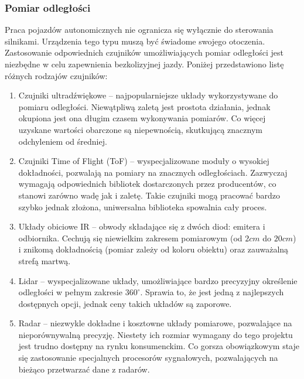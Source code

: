         \subsubsection{Pomiar odległości}
            Praca pojazdów autonomicznych nie ogranicza się wyłącznie do sterowania silnikami.
            Urządzenia tego typu muszą być świadome swojego otoczenia.
            Zastosowanie odpowiednich czujników umożliwiających pomiar odległości jest niezbędne w celu zapewnienia bezkolizyjnej jazdy.
            Poniżej przedstawiono listę różnych rodzajów czujników:
            \begin{enumerate}
                \item Czujniki ultradźwiękowe -- najpopularniejsze układy wykorzystywane do pomiaru odległości.
                Niewątpliwą zaletą jest prostota działania, jednak okupiona jest ona długim czasem wykonywania pomiarów.
                Co więcej uzyskane wartości obarczone są niepewnością, skutkującą znacznym odchyleniem od średniej.
                \item Czujniki Time of Flight (ToF) -- wyspecjalizowane moduły o wysokiej dokładności, pozwalają na pomiary na znacznych odległościach.
                Zazwyczaj wymagają odpowiednich bibliotek dostarczonych przez producentów, co stanowi zarówno wadę jak i zaletę.
                Takie czujniki mogą pracować bardzo szybko jednak złożona, uniwersalna biblioteka spowalnia cały proces.
                \item Układy obiciowe IR -- obwody składające się z dwóch diod: emitera i odbiornika.
                Cechują się niewielkim zakresem pomiarowym (od $2cm$ do $20cm$) i znikomą dokładnością (pomiar zależy od koloru obiektu) oraz zauważalną strefą martwą.
                \item Lidar -- wyspecjalizowane układy, umożliwiające bardzo precyzyjny określenie odległości w pełnym zakresie $360^\circ$.
                Sprawia to, że jest jedną z najlepszych dostępnych opcji, jednak ceny takich układów są zaporowe.
                \item Radar -- niezwykle dokładne i kosztowne układy pomiarowe, pozwalające na nieporównywalną precyzję.
                Niestety ich rozmiar wymagany do tego projektu jest trudno dostępny na rynku konsumenckim.
                Co gorsza obowiązkowym staje się zastosowanie specjalnych procesorów sygnałowych, pozwalających na bieżąco przetwarzać dane z radarów.
            \end{enumerate}
